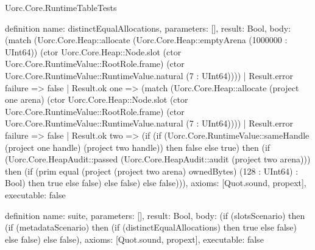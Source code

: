 \begin{lexlean}{Uorc.Core.RuntimeTableTests}
\begin{semanticmodule}
definition{
  name: distinctEqualAllocations,
  parameters: [],
  result: Bool,
  body: (match (Uorc.Core.Heap::allocate (Uorc.Core.Heap::emptyArena (1000000 : UInt64)) (ctor Uorc.Core.Heap::Node.slot (ctor Uorc.Core.RuntimeValue::RootRole.frame) (ctor Uorc.Core.RuntimeValue::RuntimeValue.natural (7 : UInt64))))
    | Result.error failure => false
    | Result.ok one => (match (Uorc.Core.Heap::allocate (project one arena) (ctor Uorc.Core.Heap::Node.slot (ctor Uorc.Core.RuntimeValue::RootRole.frame) (ctor Uorc.Core.RuntimeValue::RuntimeValue.natural (7 : UInt64))))
      | Result.error failure => false
      | Result.ok two => (if (if (Uorc.Core.RuntimeValue::sameHandle (project one handle) (project two handle)) then false else true) then (if (Uorc.Core.HeapAudit::passed (Uorc.Core.HeapAudit::audit (project two arena))) then (if (prim equal (project (project two arena) ownedBytes) (128 : UInt64) : Bool) then true else false) else false) else false))),
  axioms: [Quot.sound, propext],
  executable: false
}

definition{
  name: suite,
  parameters: [],
  result: Bool,
  body: (if (slotsScenario) then (if (metadataScenario) then (if (distinctEqualAllocations) then true else false) else false) else false),
  axioms: [Quot.sound, propext],
  executable: false
}
\end{semanticmodule}
\end{lexlean}
